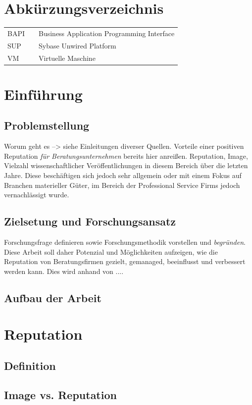 \documentclass[a4paper,oneside,12pt]{scrreprt}
\begin{document}
\chapter*{Abkürzungsverzeichnis}
\begin{tabular}{lcl}
BAPI && Business Application Programming Interface\\
SUP && Sybase Unwired Platform\\
VM && Virtuelle Maschine\\
\end{tabular}

\chapter{Einführung}
\setcounter{page}{1}
\section{Problemstellung}
Worum geht es --> siehe Einleitungen diverser Quellen. Vorteile einer positiven Reputation \textit{für Beratungsunternehmen} bereits hier anreißen.
Reputation, Image, Vielzahl wissenschaftlicher Veröffentlichungen in diesem Bereich über die letzten Jahre. Diese beschäftigen sich jedoch sehr allgemein oder mit einem Fokus auf Branchen materieller Güter, im Bereich der Professional Service Firms jedoch vernachlässigt wurde.
\section{Zielsetung und Forschungsansatz}
Forschungsfrage definieren sowie Forschungsmethodik vorstellen und \textit{begründen}.
Diese Arbeit soll daher Potenzial und Möglichkeiten aufzeigen, wie die Reputation von Beratungsfirmen gezielt, gemanaged, beeinflusst und verbessert werden kann. Dies wird anhand von .... 
\section{Aufbau der Arbeit}

\chapter{Reputation}
\section{Definition}
\section{Image vs. Reputation}
\end{document}
